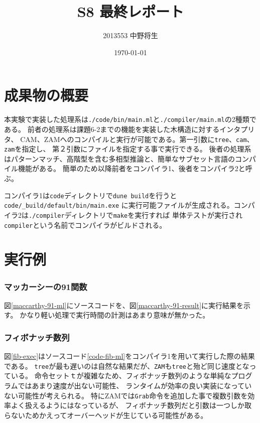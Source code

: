 \documentclass[report]{jlreq}
\author{2013553 中野将生}
\date{\today}
\title{S8 最終レポート}
\begin{document}
  \maketitle
  \chapter{成果物の概要}
    本実験で実装した処理系は\texttt{./code/bin/main.ml}と\texttt{./compiler/main.ml}の2種類である。
    前者の処理系は課題6-2までの機能を実装した木構造に対するインタプリタ、
    CAM、ZAMへのコンパイルと実行が可能である。第一引数に\texttt{tree}、\texttt{cam}、\texttt{zam}を指定し、
    第２引数にファイルを指定する事で実行できる。
    後者の処理系はパターンマッチ、高階型を含む多相型推論と、簡単なサブセット言語のコンパイル機能がある。
    簡単のため以降前者をコンパイラ1、後者をコンパイラ2と呼ぶ。

    コンパイラ1は\texttt{code}ディレクトリで\texttt{dune build}を行うと\texttt{code/\_build/default/bin/main.exe}
    に実行可能ファイルが生成される。コンパイラ2は\texttt{./compiler}ディレクトリで\texttt{make}を実行すれば
    単体テストが実行され\texttt{compiler}という名前でコンパイラがビルドされる。
  \chapter{実行例}
    \subsection{マッカーシーの91関数}
      図\ref{maccarthy-91-ml}にソースコードを、図\ref{maccarthy-91-result}に実行結果を示す。
      かなり軽い処理で実行時間の計測はあまり意味が無かった。
      
      
    \subsection{フィボナッチ数列}
      図\ref{fib-exec}はソースコード\ref{code-fib-ml}をコンパイラ1を用いて実行した際の結果である。
      \texttt{tree}が最も遅いのは自然な結果だが、\texttt{ZAM}も\texttt{tree}と殆ど同じ速度となっている。
      命令セットｔが複雑なため、フィボナッチ数列のような単純なプログラムではあまり速度が出ない可能性、
      ランタイムが効率の良い実装になっていない可能性が考えられる。
      特にZAMでは\texttt{Grab}命令を追加した事で複数引数を効率よく扱えるようにはなっているが、
      フィボナッチ数列だと引数は一つしか取らないためかえってオーバーヘッドが生じている可能性がある。
      
      
\end{document}
